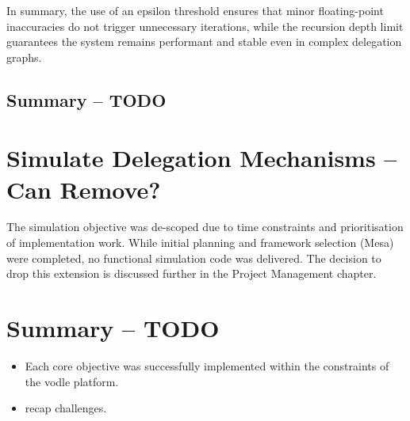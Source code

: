 In summary, the use of an epsilon threshold ensures that minor floating-point inaccuracies do not trigger unnecessary iterations, while the recursion depth limit guarantees the system remains performant and stable even in complex delegation graphs.

\subsection{Summary -- TODO}




\section{Simulate Delegation Mechanisms -- Can Remove?}
The simulation objective was de-scoped due to time constraints and prioritisation of implementation work. While initial planning and framework selection (Mesa) were completed, no functional simulation code was delivered. The decision to drop this extension is discussed further in the Project Management chapter.

\section{Summary -- TODO}
\begin{itemize}
  \item Each core objective was successfully implemented within the constraints of the vodle platform.
  \item recap challenges.
\end{itemize}

